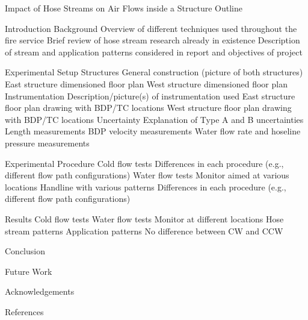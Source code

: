 \documentclass{article}
\begin{document}
Impact of Hose Streams on Air Flows inside a Structure Outline\\

\begin{outline}[enumerate]
\1 Introduction 
	\2 Background
		\3 Overview of different techniques used throughout the fire service
		\3 Brief review of hose stream research already in existence
	\2 Description of stream and application patterns considered in report and objectives of project

\1 Experimental Setup
	\2 Structures
		\3 General construction (picture of both structures)
		\3 East structure dimensioned floor plan
		\3 West structure dimensioned floor plan 
	\2 Instrumentation
		\3 Description/picture(s) of instrumentation used
		\3 East structure floor plan drawing with BDP/TC locations
		\3 West structure floor plan drawing with BDP/TC locations
	\2 Uncertainty
		\3 Explanation of Type A and B uncertainties
		\3 Length measurements
		\3 BDP velocity measurements
		\3 Water flow rate and hoseline pressure measurements

\1 Experimental Procedure
	\2 Cold flow tests
		\3 Differences in each procedure (e.g., different flow path configurations)
	\2 Water flow tests
		\3 Monitor aimed at various locations
		\3 Handline with various patterns
		\3 Differences in each procedure (e.g., different flow path configurations)
		
\1 Results
	\2 Cold flow tests
	\2 Water flow tests
		\3 Monitor at different locations
		\3 Hose stream patterns
		\3 Application patterns
			\4 No difference between CW and CCW

\1 Conclusion

\1 Future Work

\1 Acknowledgements

\1 References

\end{outline}
\end{document}

